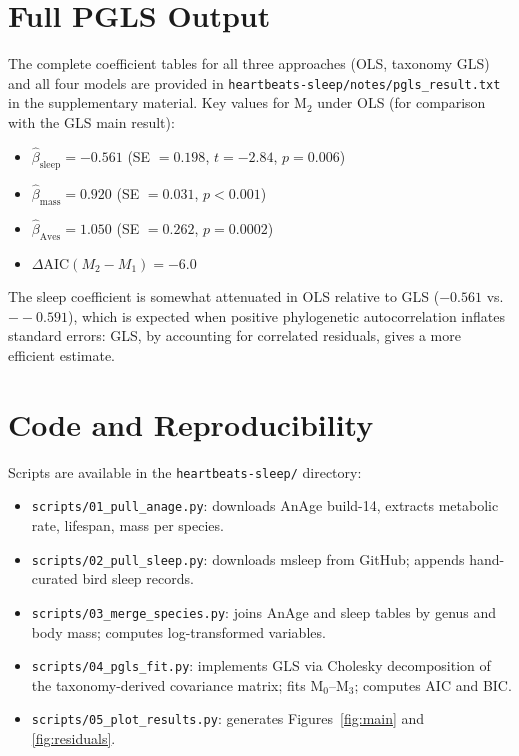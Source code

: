 \documentclass{article}
\begin{document}
\section{Full PGLS Output}
\label{app:pgls}

The complete coefficient tables for all three approaches (OLS, taxonomy GLS) and all
four models are provided in \texttt{heartbeats-sleep/notes/pgls\_result.txt} in the
supplementary material. Key values for M$_2$ under OLS (for comparison with the GLS
main result):

\begin{itemize}
  \item $\hat\beta_{\text{sleep}} = -0.561$ (SE $= 0.198$, $t = -2.84$, $p = 0.006$)
  \item $\hat\beta_{\text{mass}} = 0.920$ (SE $= 0.031$, $p < 0.001$)
  \item $\hat\beta_{\text{Aves}} = 1.050$ (SE $= 0.262$, $p = 0.0002$)
  \item $\Delta\text{AIC}(M_2 - M_1) = -6.0$
\end{itemize}

The sleep coefficient is somewhat attenuated in OLS relative to GLS ($-0.561$ vs.
$--0.591$), which is expected when positive phylogenetic autocorrelation inflates standard
errors: GLS, by accounting for correlated residuals, gives a more efficient estimate.

\section{Code and Reproducibility}
\label{app:code}

Scripts are available in the \texttt{heartbeats-sleep/} directory:

\begin{itemize}
  \item \texttt{scripts/01\_pull\_anage.py}: downloads AnAge build-14, extracts
    metabolic rate, lifespan, mass per species.
  \item \texttt{scripts/02\_pull\_sleep.py}: downloads msleep from GitHub; appends
    hand-curated bird sleep records.
  \item \texttt{scripts/03\_merge\_species.py}: joins AnAge and sleep tables by genus
    and body mass; computes log-transformed variables.
  \item \texttt{scripts/04\_pgls\_fit.py}: implements GLS via Cholesky decomposition
    of the taxonomy-derived covariance matrix; fits M$_0$--M$_3$; computes AIC and BIC.
  \item \texttt{scripts/05\_plot\_results.py}: generates Figures~\ref{fig:main} and
    \ref{fig:residuals}.
\end{itemize}
\end{document}
